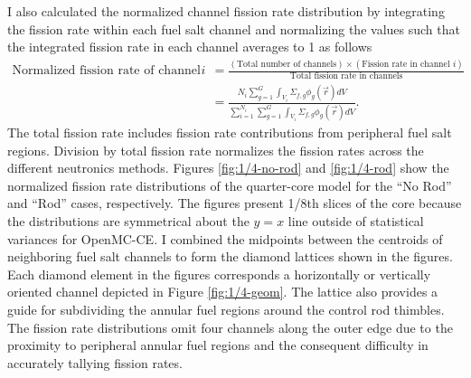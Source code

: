 I also calculated the normalized channel fission rate distribution by integrating the fission rate
within each fuel salt channel and normalizing the values such that the integrated fission rate in
each channel averages to 1 as follows
%
\begin{align}
  \text{Normalized fission rate of channel }i &= \frac{(\text{Total number of channels})\times
    (\text{Fission rate in channel }i)}{\text{Total fission rate in channels}} \nonumber \\
                                              &= \frac{N_i\sum^G_{g=1}\int_{V_i}\Sigma_{f,g}
  \phi_g(\vec{r}) dV}{
  \sum^{N_i}_{i=1}\sum^G_{g=1}\int_{V_i}\Sigma_{f,g}\phi_g(\vec{r}) dV}.
\end{align}
%
The total fission rate includes fission rate contributions from peripheral fuel salt regions.
Division by total fission rate normalizes the fission rates across the different neutronics
methods.
Figures \ref{fig:1/4-no-rod} and \ref{fig:1/4-rod} show the normalized fission rate distributions
of the quarter-core model for the ``No Rod'' and ``Rod'' cases, respectively. The figures present
1/8th slices of the core because the distributions are symmetrical about the $y=x$ line
outside of statistical variances for OpenMC-CE. I combined the midpoints between the centroids of
neighboring fuel salt channels to form the diamond lattices shown in the figures.
Each diamond element in the figures corresponds a horizontally or vertically oriented channel
depicted in Figure \ref{fig:1/4-geom}. The lattice also provides a guide for subdividing the
annular fuel regions around the control rod thimbles. The fission rate
distributions omit four channels along the outer edge due to the proximity to peripheral annular
fuel regions and the consequent difficulty in accurately tallying fission rates.


